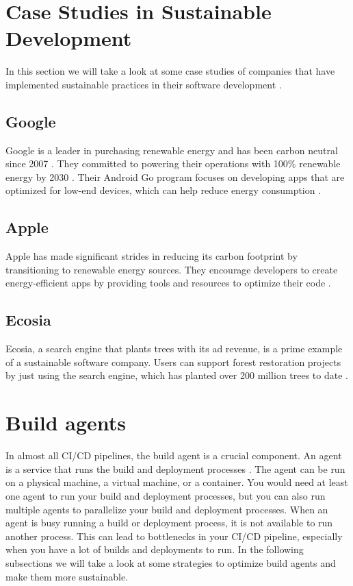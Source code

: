 \section{Case Studies in Sustainable Development}
In this section we will take a look at some case studies of companies that have implemented sustainable practices in their software development \autocite{Corewave2023}.

\subsection{Google}
Google is a leader in purchasing renewable energy and has been carbon neutral since 2007 \autocite{Pichai2020}. They committed to powering their operations with 100\% renewable energy by 2030 \autocite{PetersonCorio2022}.
Their Android Go program focuses on developing apps that are optimized for low-end devices, which can help reduce energy consumption \autocite{Corewave2023}.

\subsection{Apple}
Apple has made significant strides in reducing its carbon footprint by transitioning to renewable energy sources. 
They encourage developers to create energy-efficient apps by providing tools and resources to optimize their code \autocite{Corewave2023}.

\subsection{Ecosia}
Ecosia, a search engine that plants trees with its ad revenue, is a prime example of a sustainable software company. 
Users can support forest restoration projects by just using the search engine, which has planted over 200 million trees to date \autocite{Corewave2023}.

\section{Build agents}
In almost all CI/CD pipelines, the build agent is a crucial component. An agent is a service that runs the build and deployment processes \autocite{packt}.
The agent can be run on a physical machine, a virtual machine, or a container. 
You would need at least one agent to run your build and deployment processes, but you can also run multiple agents to parallelize your build and deployment processes.
When an agent is busy running a build or deployment process, it is not available to run another process.
This can lead to bottlenecks in your CI/CD pipeline, especially when you have a lot of builds and deployments to run.
In the following subsections we will take a look at some strategies to optimize build agents and make them more sustainable.

